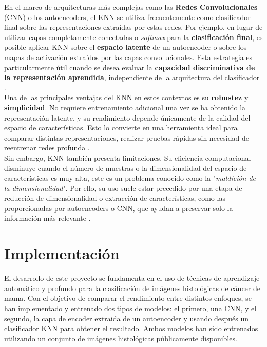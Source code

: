 \documentclass[12pt]{article} %
\begin{document}
En el marco de arquitecturas más complejas como las \textbf{Redes Convolucionales} (CNN) o los autoencoders, el KNN se utiliza frecuentemente como clasificador final sobre las representaciones extraídas por estas redes. Por ejemplo, en lugar de utilizar capas completamente conectadas o \textit{softmax} para la \textbf{clasificación final}, es posible aplicar KNN sobre el \textbf{espacio latente} de un autoencoder o sobre los mapas de activación extraídos por las capas convolucionales. Esta estrategia es particularmente útil cuando se desea evaluar la \textbf{capacidad discriminativa de la representación aprendida}, independiente de la arquitectura del clasificador \cite{van2009dimensionality}. \\

Una de las principales ventajas del KNN en estos contextos es su \textbf{robustez} y \textbf{simplicidad}. No requiere entrenamiento adicional una vez se ha obtenido la representación latente, y su rendimiento depende únicamente de la calidad del espacio de características. Esto lo convierte en una herramienta ideal para comparar distintas representaciones, realizar pruebas rápidas sin necesidad de reentrenar redes profunda \cite{bengio2013representation}. \\

Sin embargo, KNN también presenta limitaciones. Su eficiencia computacional disminuye cuando el número de muestras o la dimensionalidad del espacio de características es muy alta, este es un problema conocido como la "\textit{maldición de la dimensionalidad}". Por ello, su uso suele estar precedido por una etapa de reducción de dimensionalidad o extracción de características, como las proporcionadas por autoencoders o CNN, que ayudan a preservar solo la información más relevante \cite{aggarwal2014data}. \\

\newpage
\section{Implementación}
El desarrollo de este proyecto se fundamenta en el uso de técnicas de aprendizaje automático y profundo para la clasificación de imágenes histológicas de cáncer de mama. Con el objetivo de comparar el rendimiento entre distintos enfoques, se han implementado y entrenado dos tipos de modelos: el primero, una CNN, y el segundo, la capa de encoder extraida de un autoencoder y usando después un clasificador KNN para obtener el resultado. Ambos modelos han sido entrenados utilizando un conjunto de imágenes histológicas públicamente disponibles.\\
\end{document}
